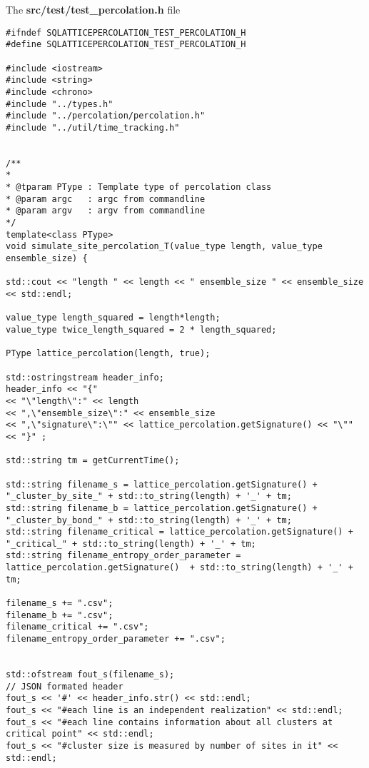 
The \textbf{src/test/test\_percolation.h} file

\begin{lstlisting}[style=CStyle]
#ifndef SQLATTICEPERCOLATION_TEST_PERCOLATION_H
#define SQLATTICEPERCOLATION_TEST_PERCOLATION_H

#include <iostream>
#include <string>
#include <chrono>
#include "../types.h"
#include "../percolation/percolation.h"
#include "../util/time_tracking.h"


/**
*
* @tparam PType : Template type of percolation class
* @param argc   : argc from commandline
* @param argv   : argv from commandline
*/
template<class PType>
void simulate_site_percolation_T(value_type length, value_type ensemble_size) {

std::cout << "length " << length << " ensemble_size " << ensemble_size << std::endl;

value_type length_squared = length*length;
value_type twice_length_squared = 2 * length_squared;

PType lattice_percolation(length, true);

std::ostringstream header_info;
header_info << "{"
<< "\"length\":" << length
<< ",\"ensemble_size\":" << ensemble_size
<< ",\"signature\":\"" << lattice_percolation.getSignature() << "\""
<< "}" ;

std::string tm = getCurrentTime();

std::string filename_s = lattice_percolation.getSignature() + "_cluster_by_site_" + std::to_string(length) + '_' + tm;
std::string filename_b = lattice_percolation.getSignature() + "_cluster_by_bond_" + std::to_string(length) + '_' + tm;
std::string filename_critical = lattice_percolation.getSignature() + "_critical_" + std::to_string(length) + '_' + tm;
std::string filename_entropy_order_parameter = lattice_percolation.getSignature()  + std::to_string(length) + '_' + tm;

filename_s += ".csv";
filename_b += ".csv";
filename_critical += ".csv";
filename_entropy_order_parameter += ".csv";


std::ofstream fout_s(filename_s);
// JSON formated header
fout_s << '#' << header_info.str() << std::endl;
fout_s << "#each line is an independent realization" << std::endl;
fout_s << "#each line contains information about all clusters at critical point" << std::endl;
fout_s << "#cluster size is measured by number of sites in it" << std::endl;


\end{lstlisting}
